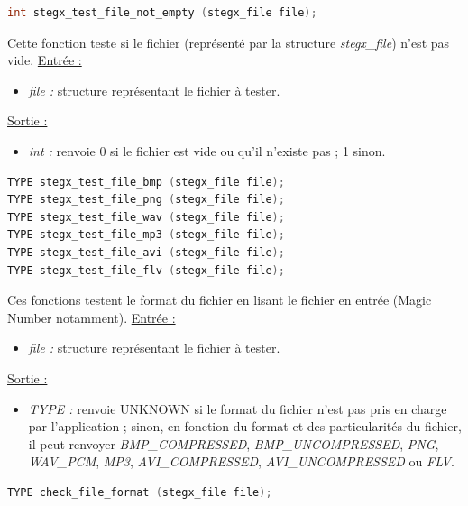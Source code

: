 \documentclass[11pt]{article}
\begin{document}
\begin{lstlisting}[language=c]
int stegx_test_file_not_empty (stegx_file file);
\end{lstlisting}

Cette fonction teste si le fichier (représenté par la structure \textit{stegx\_file})
n'est pas vide. 
\newline
\underline{Entrée :}
\begin{itemize}
\item \textit{file :} structure représentant le fichier à tester.
\end{itemize}
\underline{Sortie :} 
\begin{itemize}
\item \textit{int :} renvoie 0 si le fichier est vide ou qu'il n'existe pas ; 1 sinon. 
\newline \end{itemize}

\begin{lstlisting}[language=c]
TYPE stegx_test_file_bmp (stegx_file file);
TYPE stegx_test_file_png (stegx_file file);
TYPE stegx_test_file_wav (stegx_file file);
TYPE stegx_test_file_mp3 (stegx_file file);
TYPE stegx_test_file_avi (stegx_file file);
TYPE stegx_test_file_flv (stegx_file file);
\end{lstlisting}

Ces fonctions testent le format du fichier en lisant le fichier en entrée 
(Magic Number notamment). 
\newline
\underline{Entrée :} 
\begin{itemize}
\item \textit{file :} structure représentant le fichier à tester. 
\end{itemize}
\underline{Sortie :} 
\begin{itemize}
\item \textit{TYPE :} renvoie UNKNOWN si le format du fichier n'est pas pris en 
charge par l'application ; sinon, en fonction du format et des particularités 
du fichier, il peut renvoyer \textit{BMP\_COMPRESSED}, \textit{BMP\_UNCOMPRESSED}, 
\textit{PNG}, \textit{WAV\_PCM}, \textit{MP3}, \textit{AVI\_COMPRESSED}, 
\textit{AVI\_UNCOMPRESSED} ou \textit{FLV}. 
\newline 
\end{itemize}

\begin{lstlisting}[language=c]
TYPE check_file_format (stegx_file file);
\end{lstlisting}
\end{document}
